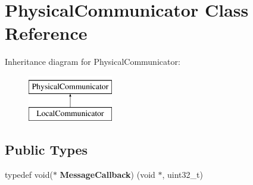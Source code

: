 \hypertarget{classPhysicalCommunicator}{}\section{Physical\+Communicator Class Reference}
\label{classPhysicalCommunicator}
Inheritance diagram for Physical\+Communicator\+:\begin{figure}[H]
\begin{center}
\leavevmode
\includegraphics[height=2.000000cm]{classPhysicalCommunicator}
\end{center}
\end{figure}
\subsection*{Public Types}
\begin{DoxyCompactItemize}
\item 
\mbox{\label{classPhysicalCommunicator_ac0fb9cea7a3e3ffecedc57be9684ebbf}} 
typedef void($\ast$ {\bfseries Message\+Callback}) (void $\ast$, uint32\+\_\+t)
\end{DoxyCompactItemize}
